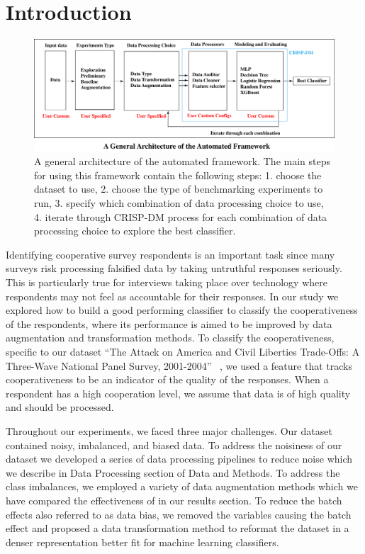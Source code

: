 \section{Introduction}\label{sec:introduction}
\begin{figure}[t!]
    \centering
    \includegraphics[width=\linewidth]{Figures/Figure1.pdf}
    \caption{A general architecture of the automated framework. The main steps for using this framework contain the following steps: 1. choose the dataset to use, 2. choose the type of benchmarking experiments to run, 3. specify which combination of data processing choice to use, 4. iterate through CRISP-DM process for each combination of data processing choice to explore the best classifier.}
    \label{fig:figure1}
\end{figure} 

Identifying cooperative survey respondents is an important task since many surveys risk processing falsified data by taking untruthful responses seriously. This is particularly true for interviews taking place over technology where respondents may not feel as accountable for their responses. In our study we explored how to build a good performing classifier to classify the cooperativeness of the respondents, where its performance is aimed to be improved by data augmentation and transformation methods. To classify the cooperativeness, specific to our dataset ``The Attack on America and Civil Liberties Trade-Offs: A Three-Wave National Panel Survey, 2001-2004'' ~\cite{data}, we used a feature that tracks cooperativeness to be an indicator of the quality of the responses. When a respondent has a high cooperation level, we assume that data is of high quality and should be processed. 

Throughout our experiments, we faced three major challenges. Our dataset contained noisy, imbalanced, and biased data. To address the noisiness of our dataset we developed a series of data processing pipelines to reduce noise which we describe in Data Processing section of Data and Methods. To address the class imbalances, we employed a variety of data augmentation methods which we have compared the effectiveness of in our results section. To reduce the batch effects also referred to as data bias, we removed the variables causing the batch effect and proposed a data transformation method to reformat the dataset in a denser representation better fit for machine learning classifiers. 


